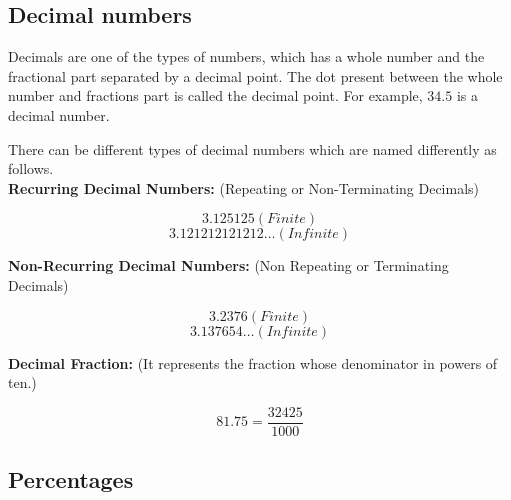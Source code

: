 \documentclass{article} %
\begin{document}
\subsection{Decimal numbers}
Decimals are one of the types of numbers, which has a whole number and the fractional part separated by a decimal point. The dot present between the whole number and fractions part is called the decimal point. For example, $34.5$ is a decimal number.

There can be different types of decimal numbers which are named differently as follows.\\

\textbf{Recurring Decimal Numbers:} (Repeating or Non-Terminating Decimals)

\[
3.125125 (Finite)
\]
\[
3.121212121212\dots (Infinite)
\]

\textbf{Non-Recurring Decimal Numbers:} (Non Repeating or Terminating Decimals)

\[
3.2376 (Finite)
\]
\[
3.137654\dots (Infinite)
\]

\textbf{Decimal Fraction:} (It represents the fraction whose denominator in powers of ten.)

\[
81.75 = \frac{32425}{1000} 
\]

\subsection{Percentages}
\end{document}
